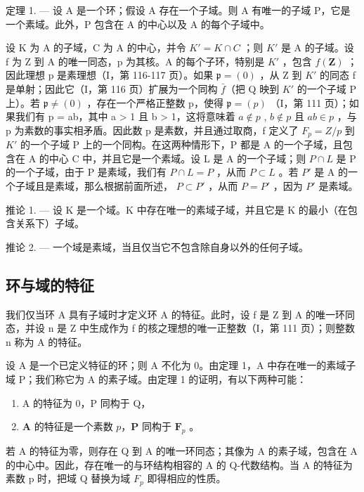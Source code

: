 定理 1. --- 设 A 是一个环；假设 A 存在一个子域。则 A 有唯一的子域 P，它是一个素域。此外，P 包含在 A 的中心以及 A 的每个子域中。

设 K 为 A 的子域，C 为 A 的中心，并令 \(K' = K \cap C\) ；则 \(K'\) 是 A 的子域。设 f 为 Z 到 A 的唯一同态，p 为其核。A 的每个子环，特别是 \(K'\) ，包含 \(f(\mathbf{Z})\) ；因此理想 p 是素理想（I，第 116-117 页）。如果 \(\mathfrak{p} = (0)\) ，从 Z 到 \(K'\) 的同态 f 是单射；因此它（I，第 116 页）扩展为一个同构 \(\bar{f}\)（把 Q 映到 \(K'\) 的一个子域 P 上）。若 \(\mathfrak{p} \neq (0)\) ，存在一个严格正整数 p，使得 \(\mathfrak{p} = (p)\) （I，第 111 页）；如果我们有 p = ab，其中 a \textgreater{} 1 且 b \textgreater{} 1，这将意味着 \(a \notin p\) , \(b \notin p\) 且 \(ab \in p\) ，与 p 为素数的事实相矛盾。因此数 p 是素数，并且通过取商，f 定义了 \(F_p = Z/p\) 到 \(K'\) 的一个子域 P 上的一个同构。在这两种情形下，P 都是 A 的一个子域，且包含在 A 的中心 C 中，并且它是一个素域。设 L 是 A 的一个子域；则 \(P \cap L\) 是 P 的一个子域，由于 P 是素域，我们有 \(P \cap L = P\) ，从而 \(P \subset L\) 。若 \(P'\) 是 A 的一个子域且是素域，那么根据前面所述， \(P \subset P'\) ，从而 \(P = P'\) ，因为 \(P'\) 是素域。

推论 1. --- 设 K 是一个域。K 中存在唯一的素域子域，并且它是 K 的最小（在包含关系下）子域。

推论 2. --- 一个域是素域，当且仅当它不包含除自身以外的任何子域。

\subsection{环与域的特征}

我们仅当环 A 具有子域时才定义环 A 的特征。此时，设 f 是 Z 到 A 的唯一环同态，并设 n 是 Z 中生成作为 f 的核之理想的唯一正整数（I，第 111 页）；则整数 n 称为 A 的特征。

设 A 是一个已定义特征的环；则 A 不化为 0。由定理 1，A 中存在唯一的素域子域 P；我们称它为 A 的素子域。由定理 1 的证明，有以下两种可能：

\begin{enumerate}
\def\labelenumi{\alph{enumi})}
\item
  A 的特征为 0，P 同构于 Q，
\item
  \(\mathbf{A}\) 的特征是一个素数 \(p\)，\(\mathbf{P}\) 同构于 \(\mathbf{F}_p\) 。
\end{enumerate}

若 A 的特征为零，则存在 Q 到 A 的唯一环同态；其像为 A 的素子域，包含在 A 的中心中。因此，存在唯一的与环结构相容的 A 的 Q-代数结构。当 A 的特征为素数 p 时，把域 Q 替换为域 \(F_{p}\) 即得相应的性质。

